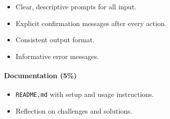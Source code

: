\documentclass[
  justified,
  openright,
]{tufte-book}
\let\subsubsection\paragraph
\let\paragraph\paragraph
\let\subsubsection\paragraph
\let\paragraph\paragraph
\providecommand{\tightlist}{%
  \setlength{\itemsep}{0pt}\setlength{\parskip}{0pt}}
\begin{document}
\begin{itemize}
\tightlist
\item[$\square$]
  Clear, descriptive prompts for all input.
\item[$\square$]
  Explicit confirmation messages after every action.
\item[$\square$]
  Consistent output format.
\item[$\square$]
  Informative error messages.
\end{itemize}

\subsubsection{Documentation (5\%)}\label{documentation-5}

\begin{itemize}
\tightlist
\item[$\square$]
  \texttt{README.md} with setup and usage instructions.
\item[$\square$]
  Reflection on challenges and solutions.
\end{itemize}
\end{document}
